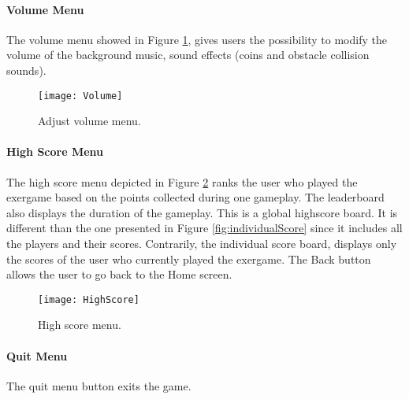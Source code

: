 \paragraph{Volume Menu}
The volume menu showed in Figure \ref{fig:volume}, gives users the possibility to modify the volume of the background music, sound effects (coins and obstacle collision sounds).
\begin{figure}[h]
    \centering
    \texttt{[image: Volume]}
    \caption{Adjust volume menu.}
    \label{fig:volume}
\end{figure}
\paragraph{High Score Menu}
The high score menu depicted in Figure \ref{fig:highscore} ranks the user who played the exergame based on the points collected during one gameplay. The leaderboard also displays the duration of the gameplay. This is a global highscore board. It is different than the one presented in Figure \ref{fig:individualScore} since it includes all the players and their scores. Contrarily, the individual score board, displays only the scores of the user who currently played the exergame. The Back button allows the user to go back to the Home screen.\\
\begin{figure}[h]
    \centering
    \texttt{[image: HighScore]}
    \caption{High score menu.}
    \label{fig:highscore}
\end{figure}
\paragraph{Quit Menu}
The quit menu button exits the game. 
